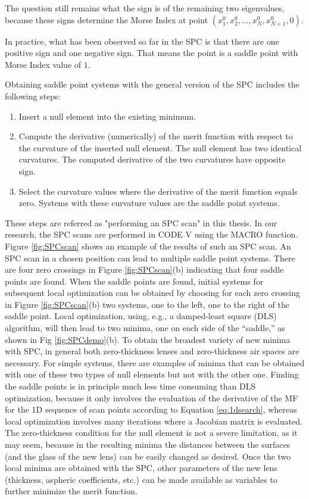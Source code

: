 The question still remains what the sign is of the remaining two eigenvalues, because these signs determine the Morse Index at point $(x^{0}_1, x^{0}_{2},...,x^{0}_{N},x^{0}_{N+1},0)$.
\vspace{0.3em}

In practice, what has been observed so far in the SPC is that there are one positive sign and one negative sign. That means the point is a saddle point with Morse Index value of $1$. 

Obtaining saddle point systems with the general version of the SPC includes the following steps:
\begin{enumerate}[nosep] \label{para: performing SPC scan}
\item Insert a null element into the existing minimum.
\item Compute the derivative (numerically) of the merit function with respect to the curvature of the inserted null element. The null element has two identical curvatures. The computed derivative of the two curvatures have opposite sign. 
\item Select the curvature values where the derivative of the merit function equals zero. Systems with these curvature values are the saddle point systems. 
\end{enumerate}
These steps are referred as "performing an SPC scan" in this thesis.  In our research, the SPC scans are performed in CODE V using the MACRO function. Figure \ref{fig:SPCscan} shows an example of the results of such an SPC scan. An SPC scan in a chosen position can lead to multiple saddle point systems.  There are four zero crossings in Figure \ref{fig:SPCscan}(b) indicating that four saddle points are found. When the saddle points are found, initial systems for subsequent local optimization can be obtained by choosing for each zero crossing in Figure \ref{fig:SPCscan}(b) two systems, one to the left, one to the right of the saddle point. Local optimization, using, e.g., a damped-least square (DLS) algorithm, will then lead to two minima, one on each side of the “saddle,” as shown in Fig \ref{fig:SPCdemo}(b). To obtain the broadest variety of new minima with SPC, in general both zero-thickness lenses and zero-thickness air spaces are necessary. For simple systems, there are examples of minima that can be obtained with one of these two types of null elements but not with the other one. Finding the saddle points is in principle much less time consuming than DLS optimization, because it only involves the evaluation of the derivative of the MF for the 1D sequence of scan points according to Equation \ref{eq:1dsearch}, whereas local optimization involves many iterations where a Jacobian matrix is evaluated. The zero-thickness condition for the null element is not a severe limitation, as it may seem, because in the resulting minima the distances between the surfaces (and the glass of the new lens) can be easily changed as desired. Once the two local minima are obtained with the SPC, other parameters of the new lens (thickness, aspheric coefficients, etc.) can be made available as variables to further minimize the merit function.

